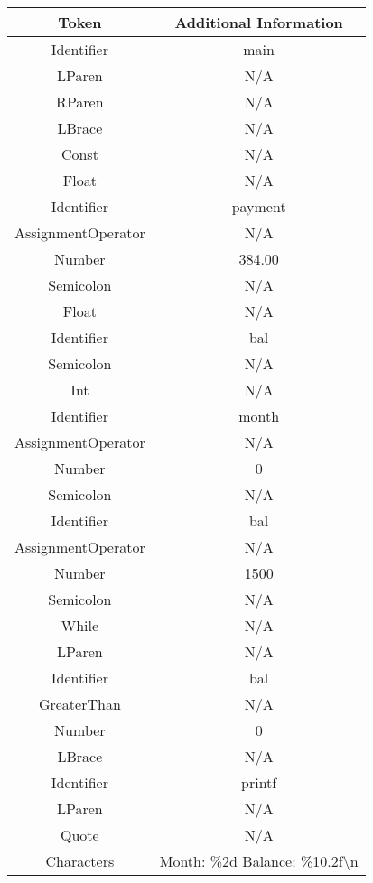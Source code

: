 \documentclass[letterpaper, 10pt, DIV=13]{scrartcl}
\numberwithin{equation}{section}
\numberwithin{figure}{section}
\numberwithin{table}{section}
\begin{document}
\begin{center}
\begin{longtable}{|c|c|}
    \hline
    Token & Additional Information \\
    \hline
    Identifier & main \\
    \hline
    LParen & N/A \\
    \hline
    RParen & N/A \\
    \hline
    LBrace & N/A \\
    \hline
    Const & N/A \\
    \hline
    Float & N/A \\ 
    \hline
    Identifier & payment \\
    \hline
    AssignmentOperator & N/A \\
    \hline
    Number & 384.00 \\
    \hline
    Semicolon & N/A \\
    \hline
    Float & N/A \\
    \hline
    Identifier & bal \\
    \hline
    Semicolon & N/A \\
    \hline
    Int & N/A \\
    \hline
    Identifier & month \\
    \hline
    AssignmentOperator & N/A \\
    \hline
    Number & 0 \\
    \hline
    Semicolon & N/A \\
    \hline
    Identifier & bal \\
    \hline
    AssignmentOperator & N/A \\
    \hline
    Number & 1500 \\
    \hline
    Semicolon & N/A \\
    \hline
    While & N/A \\
    \hline
    LParen & N/A \\
    \hline
    Identifier & bal \\
    \hline
    GreaterThan & N/A \\
    \hline
    Number & 0 \\
    \hline
    LBrace & N/A \\
    \hline
    Identifier & printf \\
    \hline
    LParen & N/A \\
    \hline
    Quote & N/A \\
    \hline
    Characters & Month: \%2d Balance: \%10.2f\textbackslash n \\

\end{longtable}
\end{center}
\end{document}
